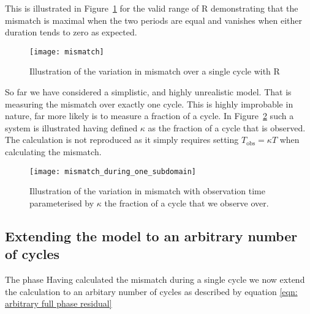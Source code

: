 This is illustrated in Figure~\ref{fig: Lyne mismatch} for the valid range of R
demonstrating that the mismatch is maximal when the two periods are equal and
vanishes when either duration tends to zero as expected.

\begin{figure}[ht]
\centering
\texttt{[image: mismatch]}
\caption{Illustration of the variation in mismatch over a single cycle with R}
\label{fig: Lyne mismatch}
\end{figure}

So far we have considered a simplistic, and highly unrealistic model. That is
measuring the mismatch over exactly one cycle. This is highly improbable in nature,
far more likely is to measure a fraction of a cycle. In Figure~\ref{fig: Lyne mismatch kappa}
such a system is illustrated having defined $\kappa$ as the fraction of a cycle that
is observed. The calculation is not reproduced as it simply requires setting 
$T_{\mathrm{obs}} = \kappa T$ when calculating the mismatch.

\begin{figure}[ht]
\centering
\texttt{[image: mismatch\_during\_one\_subdomain]}
\caption{Illustration of the variation in mismatch with observation time 
parameterised by $\kappa$ the fraction of a cycle that we observe over.}
\label{fig: Lyne mismatch kappa}
\end{figure}
\FloatBarrier

\subsection{Extending the model to an arbitrary number of cycles} The phase
Having calculated the mismatch during a single cycle we now extend the calculation
to an arbitary number of cycles as described by equation \eqref{eqn: arbitrary full phase residual}

